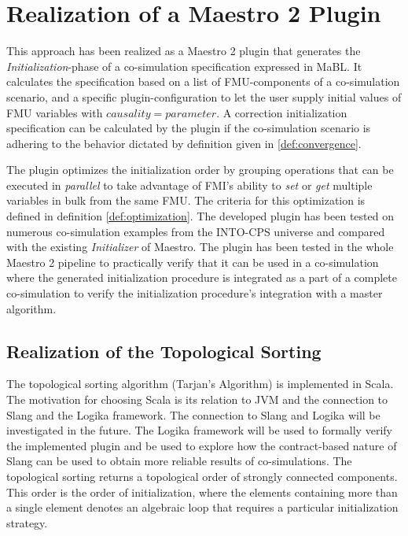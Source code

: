 \section{Realization of a Maestro 2 Plugin}\label{sc:implementation}
This approach has been realized as a Maestro 2 plugin that generates the \textit{Initialization}-phase of a co-simulation specification expressed in MaBL. It calculates the specification based on a list of FMU-components of a co-simulation scenario, and a specific plugin-configuration to let the user supply initial values of FMU variables with $causality=parameter$. A correction initialization specification can be calculated by the plugin if the co-simulation scenario is adhering to the behavior dictated by definition given in \ref{def:convergence}.

The plugin optimizes the initialization order by grouping operations that can be executed in \textit{parallel} to take advantage of FMI's ability to \textit{set} or \textit{get} multiple variables in bulk from the same FMU. The criteria for this optimization is defined in definition \ref{def:optimization}. 
The developed plugin has been tested on numerous co-simulation examples from the INTO-CPS universe\cite{Maestro} and compared with the existing \textit{Initializer} of Maestro. The plugin has been tested in the whole Maestro 2 pipeline to practically verify that it can be used in a co-simulation where the generated initialization procedure is integrated as a part of a complete co-simulation to verify the initialization procedure's integration with a master algorithm.

\subsection{Realization of the Topological Sorting}
The topological sorting algorithm (Tarjan's Algorithm) is implemented in Scala. The motivation for choosing Scala is its relation to JVM and the connection to Slang and the Logika framework\cite{inbook}. The connection to Slang and Logika will be investigated in the future. The Logika framework will be used to formally verify the implemented plugin and be used to explore how the contract-based nature of Slang can be used to obtain more reliable results of co-simulations. The topological sorting returns a topological order of strongly connected components. This order is the order of initialization, where the elements containing more than a single element denotes an algebraic loop that requires a particular initialization strategy. 

